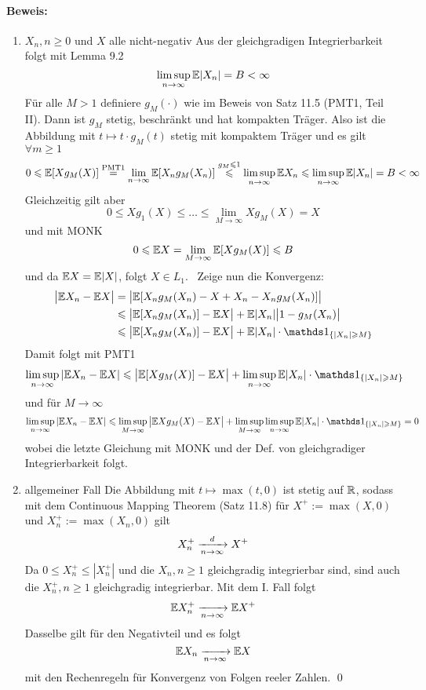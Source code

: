 \documentclass[11pt]{report}
\begin{document}
\paragraph{Beweis:}
\begin{enumerate}[label=\Roman*.]
    \item $X_n,n\geq0$ und $X$ alle nicht-negativ\newline 
    Aus der gleichgradigen Integrierbarkeit folgt mit Lemma 9.2
    $$\displaystyle\limsup_{n\to\infty}\mathbb{E}|X_n|=B<\infty$$
    F\"ur alle $M>1$ definiere $g_M(\cdot)$ wie im Beweis von Satz 11.5 (PMT1, Teil II). Dann ist $g_M$ stetig, beschr\"ankt und hat kompakten Tr\"ager. Also ist die Abbildung mit $t\mapsto t\cdot g_M(t)$ stetig mit kompaktem Tr\"ager und es gilt $\forall m\geq1$
    $$0\leqslant\mathbb{E}[Xg_M(X)]\overset{\text{PMT1}}{=}\lim_{n\to\infty}\mathbb{E}[X_ng_M(X_n)]\overset{g_M\leqslant1}{\leqslant}\limsup_{n\to\infty}\mathbb{E} X_n\leqslant\limsup_{n\to\infty}\mathbb{E} |X_n|=B<\infty$$
    Gleichzeitig gilt aber
    $$0\leq Xg_1(X)\leq\hdots\leq\lim_{M\to\infty}Xg_M(X)=X$$
    und mit MONK %
    $$0\leqslant\mathbb{E} X=\lim_{M\to\infty}\mathbb{E}[Xg_M(X)]\leqslant B$$
    und da $\mathbb{E} X=\mathbb{E}|X|$, folgt $X\in L_1.$ \newline\newline
    Zeige nun die Konvergenz:
    \begin{align*}
        \big|\E X_n-\E X\big|&=\big|\E[X_ng_M(X_n)-X+X_n-X_ng_M(X_n)]\big|\\
        &\leq\big|\E[X_ng_M(X_n)]-\E X\big|+\E|X_n|\big|1-g_M(X_n)\big| \\
        &\leq\big|\E[X_ng_M(X_n)]-\E X\big|+\E|X_n|\cdot\ind{\{|X_n|\geq M\}}
    \end{align*}
    Damit folgt mit PMT1
    $$\limsup_{n\to\infty}|\E X_n-\E X|\leq\big|\E[Xg_M(X)]-\E X\big|+\limsup_{n\to\infty}\E|X_n|\cdot\ind{\{|X_n|\geq M\}}$$
    und f\"ur $M\to\infty$
    $$\limsup_{n\to\infty}|\E X_n-\E X|\leq\limsup_{M\to\infty}\big|\E Xg_M(X)-\E X\big|+\limsup_{M\to\infty}\limsup_{n\to\infty}\E|X_n|\cdot\ind{\{|X_n|\geq M\}}=0$$
    wobei die letzte Gleichung mit MONK und der Def. von  gleichgradiger Integrierbarkeit folgt.
    \item allgemeiner Fall\newline
    Die Abbildung mit $t\mapsto\max(t,0)$ ist stetig auf $\mathbb{R}$, sodass mit dem Continuous Mapping Theorem (Satz 11.8) für $X^+:=\max(X,0)$ und $X_n^+:=\max(X_n,0)$ gilt
    $$X_n^+\nto{d}{n\to\infty}X^+$$
    Da $0\leq X_n^+\leq|X_n^+|$ und die $X_n,n\geq1$ gleichgradig integrierbar sind, sind auch die $X_n^+,n\geq1$ gleichgradig integrierbar. Mit dem I. Fall folgt 
    $$\E X_n^+\nto{}{n\to\infty}\E X^+$$
    Dasselbe gilt für den Negativteil und es folgt
    $$\E X_n\nto{}{n\to\infty}\E X$$
    mit den Rechenregeln für Konvergenz von Folgen reeler Zahlen. \qed
\end{enumerate}
\end{document}
